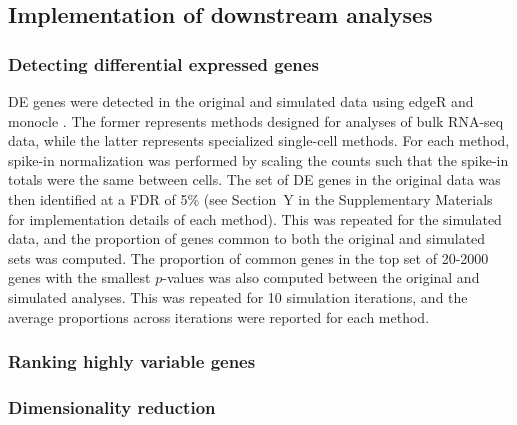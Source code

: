 \documentclass{article}
\begin{document}
\subsection{Implementation of downstream analyses}

\subsubsection{Detecting differential expressed genes}
DE genes were detected in the original and simulated data using edgeR \cite{lund2012detecting} and monocle \cite{trapnell2014dynamics}.
The former represents methods designed for analyses of bulk RNA-seq data, while the latter represents specialized single-cell methods.
For each method, spike-in normalization was performed by scaling the counts such that the spike-in totals were the same between cells.
The set of DE genes in the original data was then identified at a FDR of 5\% (see Section~Y in the Supplementary Materials for implementation details of each method).
This was repeated for the simulated data, and the proportion of genes common to both the original and simulated sets was computed.
The proportion of common genes in the top set of 20-2000 genes with the smallest $p$-values was also computed between the original and simulated analyses.
This was repeated for 10 simulation iterations, and the average proportions across iterations were reported for each method.

\subsubsection{Ranking highly variable genes}

\subsubsection{Dimensionality reduction}


{\small


}
\end{document}
